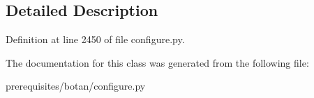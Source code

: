 \subsection{Detailed Description}


Definition at line 2450 of file configure.\+py.



The documentation for this class was generated from the following file\+:\begin{DoxyCompactItemize}
\item 
prerequisites/botan/configure.\+py\end{DoxyCompactItemize}

